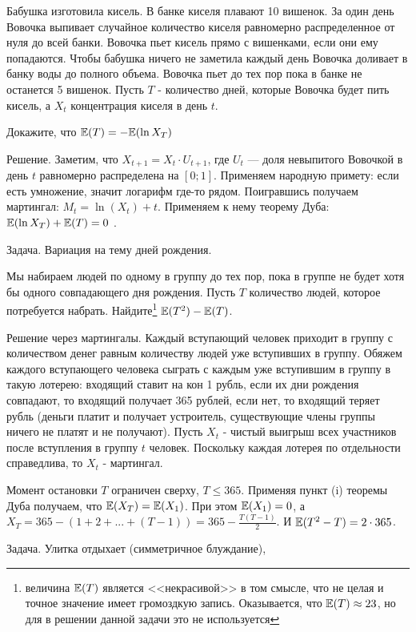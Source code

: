 {Бабушка изготовила кисель. В банке киселя плавают 10 вишенок. За один день Вовочка выпивает случайное количество киселя равномерно распределенное от нуля до всей банки. Вовочка пьет кисель прямо с вишенками, если они ему попадаются. Чтобы бабушка ничего не заметила каждый день Вовочка доливает в банку воды до полного объема.
Вовочка пьет до тех пор пока в банке не останется 5 вишенок. Пусть $T$ - количество дней, которые Вовочка будет пить кисель, а $X_{t}$ концентрация киселя в день $t$.

Докажите, что $\mathbb{E}(T)=-\mathbb{E}(\ln X_{T})$

Решение. Заметим, что $ X_{t+1}=X_{t}\cdot U_{t+1} $, где $ U_{t} $ --- доля невыпитого Вовочкой в день $ t $ равномерно распределена на $ [0;1] $. Применяем народную примету: если есть умножение, значит логарифм где-то рядом. Поигравшись получаем мартингал: $ M_{t}=\ln(X_{t})+t$. Применяем к нему теорему Дуба: $\mathbb{E}(\ln X_{T})+\mathbb{E}(T)=0$ .




Задача. Вариация на тему дней рождения.

Мы набираем людей по одному в группу до тех пор, пока в группе не будет хотя бы одного совпадающего дня рождения. Пусть $T$ количество людей, которое потребуется набрать. Найдите\footnote{величина $\mathbb{E}(T)$ является <<некрасивой>> в том смысле, что не целая и точное значение имеет громоздкую запись. Оказывается, что $\mathbb{E}(T)\approx 23$, но для в решении данной задачи это не используется} $\mathbb{E}(T^{2})-\mathbb{E}(T)$.

Решение через мартингалы. Каждый вступающий человек приходит в группу с количеством денег равным количеству людей уже вступивших в группу. Обяжем каждого вступающего человека сыграть с каждым уже вступившим в группу в такую лотерею: входящий ставит на кон 1 рубль, если их дни рождения совпадают, то входящий получает 365 рублей, если нет, то входящий теряет рубль (деньги платит и получает устроитель, существующие члены группы ничего не платят и не получают). Пусть $X_{t}$ - чистый выигрыш всех участников после вступления в группу $t$ человек. Поскольку каждая лотерея по отдельности справедлива, то $X_{t}$ - мартингал.

Момент остановки $T$ ограничен сверху, $T\leq 365$. Применяя пункт (i) теоремы Дуба получаем, что $\mathbb{E}(X_{T})=\mathbb{E}(X_{1})$. При этом $\mathbb{E}(X_{1})=0$, а $X_{T}=365-(1+2+...+(T-1))=365-\frac{T(T-1)}{2}$. И $\mathbb{E}(T^{2}-T)=2\cdot 365$.

Задача. Улитка отдыхает (симметричное блуждание), \cite{blom:pspt}

}
